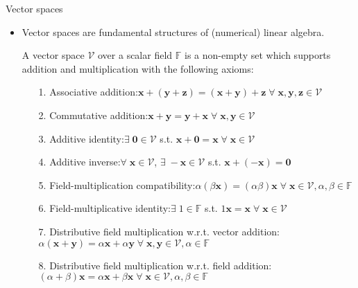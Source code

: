 \documentclass[t,usepdftitle=false]{beamer}
\begin{document}
\begin{frame}{Vector spaces}
\begin{itemize}
\item Vector spaces are fundamental structures of (numerical) linear algebra.\vspace{-.12cm}
\begin{definition}
A vector space $\mathcal{V}$ over a scalar field $\mathbb{F}$ is a non-empty set which supports addition and multiplication with the following axioms:
\begin{enumerate}
\item[1.] Associative addition:\hfill$\mathbf{x}+(\mathbf{y}+\mathbf{z})=(\mathbf{x}+\mathbf{y})+\mathbf{z}\;\forall\;\mathbf{x},\mathbf{y},\mathbf{z}\in \mathcal{V}$
\item[2.] Commutative addition:\hfill$\mathbf{x}+\mathbf{y}=\mathbf{y}+\mathbf{x}\;\forall\;\mathbf{x},\mathbf{y}\in \mathcal{V}$
\item[3.] Additive identity:\hfill$\exists\;\boldsymbol{0}\in \mathcal{V}$ s.t. $\mathbf{x}+\boldsymbol{0}=\mathbf{x}\;\forall\;\mathbf{x}\in \mathcal{V}$
\item[4.] Additive inverse:\hfill$\forall\;\mathbf{x}\in \mathcal{V}$, $\exists\;-\mathbf{x}\in \mathcal{V}$ s.t. $\mathbf{x}+(-\mathbf{x})=\boldsymbol{0}$
\item[5.] Field-multiplication compatibility:\hfill$\alpha(\beta \mathbf{x})=(\alpha\beta)\mathbf{x}\;\forall\;\mathbf{x}\in \mathcal{V},\alpha,\beta\in\mathbb{F}$
\item[6.] Field-multiplicative identity:\hfill$\exists\;1\in\mathbb{F}$ s.t. $1\mathbf{x}=\mathbf{x}\;\forall\;\mathbf{x}\in \mathcal{V}$
\item[7.] Distributive field multiplication w.r.t. $\!$vector addition:\\
\hfill$\alpha(\mathbf{x}+\mathbf{y})=\alpha \mathbf{x}+\alpha \mathbf{y}\;\forall\;\mathbf{x},\mathbf{y}\in \mathcal{V},\alpha\in\mathbb{F}$
\item[8.] Distributive field multiplication w.r.t. $\!$field addition:\\
\hfill$(\alpha+\beta)\mathbf{x}=\alpha \mathbf{x}+\beta \mathbf{x}\;\forall\;\mathbf{x}\in \mathcal{V},\alpha,\beta\in \mathbb{F}$
\end{enumerate}
\end{definition}
\end{itemize}
\end{frame}
\end{document}
